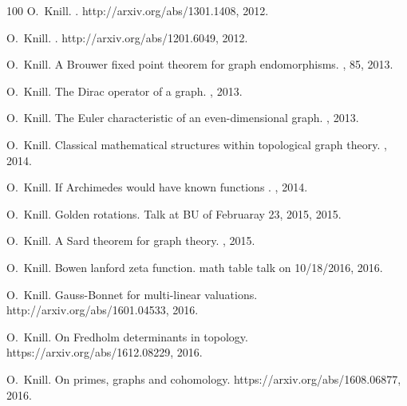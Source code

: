 \documentclass[12pt]{amsart}
\begin{document}
\begin{thebibliography}{100}
O.~Knill.
.
\newblock http://arxiv.org/abs/1301.1408, 2012.

O.~Knill.
.
\newblock http://arxiv.org/abs/1201.6049, 2012.

O.~Knill.
\newblock A {Brouwer} fixed point theorem for graph endomorphisms.
, 85, 2013.

O.~Knill.
\newblock The {D}irac operator of a graph.
, 2013.

O.~Knill.
\newblock The {E}uler characteristic of an even-dimensional graph.
, 2013.

O.~Knill.
\newblock Classical mathematical structures within topological graph theory.
, 2014.

O.~Knill.
\newblock If {A}rchimedes would have known functions \hfill.
, 2014.

O.~Knill.
\newblock Golden rotations.
\newblock Talk at BU of Februaray 23, 2015, 2015.

O.~Knill.
\newblock A {S}ard theorem for graph theory.
, 2015.

O.~Knill.
\newblock Bowen lanford zeta function.
\newblock math table talk on 10/18/2016, 2016.

O.~Knill.
\newblock Gauss-{B}onnet for multi-linear valuations.
\newblock {\\}http://arxiv.org/abs/1601.04533, 2016.

O.~Knill.
\newblock On {F}redholm determinants in topology.
\newblock {\\}https://arxiv.org/abs/1612.08229, 2016.

O.~Knill.
\newblock On primes, graphs and cohomology.
\newblock https://arxiv.org/abs/1608.06877, 2016.


\end{thebibliography}
\end{document}
